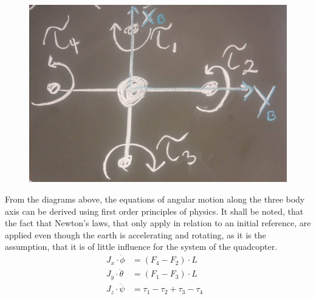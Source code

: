 \begin{minipage}{\linewidth}
\begin{minipage}{0.45\linewidth}
\begin{figure}[H]
			\label{fig:diagramQuad}
		\end{figure}
	\end{minipage}
	\hspace{0.03\linewidth}
	\begin{minipage}{0.45\linewidth}
		\begin{figure}[H] \vspace{16mm}
			\includegraphics[scale=.18]{figures/torques_diagram}
			\centering
			\label{fig:diagramTorque}
		\end{figure}
	\end{minipage}
\end{minipage}

From the diagrams above, the equations of angular motion along the three body axis can be derived using first order principles of physics. It shall be noted, that the fact that Newton's laws, that only apply in relation to an initial reference, are applied even though the earth is accelerating and rotating, as it is the assumption, that it is of little influence for the system of the quadcopter. 
%
\begin{align}
	J_x\cdot\ddot{\phi}&=(F_4-F_2)\cdot L &\\
	J_y \cdot\ddot{\theta}&=(F_1-F_3)\cdot L &\\
	J_z\cdot\ddot{\psi}&=\tau_1-\tau_2+\tau_3-\tau_4
	\label{eq:AngleEq}
\end{align}

